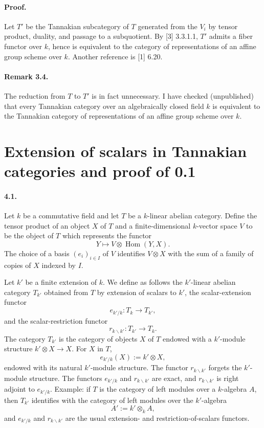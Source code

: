 \documentclass[11pt]{article}
\newcommand{\Hom}{\operatorname{Hom}}
\theoremstyle{plain}
\theoremstyle{definition}
\begin{document}
\paragraph{Proof.} Let $T'$ be the Tannakian subcategory of $T$ generated from the $V_i$ by tensor product, duality, and passage to a subquotient. By [3] 3.3.1.1, $T'$ admits a fiber functor over $k$, hence is equivalent to the category of representations of an affine group scheme over $k$. Another reference is [1] 6.20.

\paragraph{Remark 3.4.} The reduction from $T$ to $T'$ is in fact unnecessary. I have checked (unpublished) that every Tannakian category over an algebraically closed field $k$ is equivalent to the Tannakian category of representations of an affine group scheme over $k$.

\section{Extension of scalars in Tannakian categories and proof of 0.1}
\paragraph{4.1.} Let $k$ be a commutative field and let $T$ be a $k$-linear abelian category. Define the tensor product of an object $X$ of $T$ and a finite-dimensional $k$-vector space $V$ to be the object of $T$ which represents the functor
\[
   Y\longmapsto V\otimes\Hom(Y,X).
\]
The choice of a basis $(e_i)_{i\in I}$ of $V$ identifies $V\otimes X$ with the sum of a family of copies of $X$ indexed by $I$.

Let $k'$ be a finite extension of $k$. We define as follows the $k'$-linear abelian category $T_{k'}$ obtained from $T$ by extension of scalars to $k'$, the scalar-extension functor
\[
   e_{k'/k}:T_k\longrightarrow T_{k'},
\]
and the scalar-restriction functor
\[
   r_{k\backslash k'}:T_{k'}\longrightarrow T_k.
\]
The category $T_{k'}$ is the category of objects $X$ of $T$ endowed with a $k'$-module structure $k'\otimes X\to X$. For $X$ in $T$,
\[
   e_{k'/k}(X):=k'\otimes X,
\]
endowed with its natural $k'$-module structure. The functor $r_{k\backslash k'}$ forgets the $k'$-module structure. The functors $e_{k'/k}$ and $r_{k\backslash k'}$ are exact, and $r_{k\backslash k'}$ is right adjoint to $e_{k'/k}$. Example: if $T$ is the category of left modules over a $k$-algebra $A$, then $T_{k'}$ identifies with the category of left modules over the $k'$-algebra
\[
   A':=k'\otimes_k A,
\]
and $e_{k'/k}$ and $r_{k\backslash k'}$ are the usual extension- and restriction-of-scalars functors.
\end{document}
